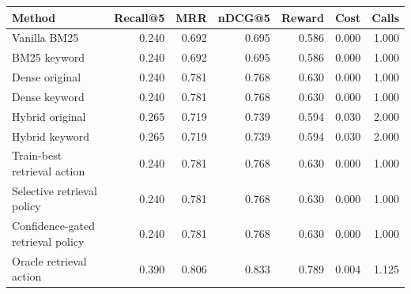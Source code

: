 \begin{tabular}{lrrrrrr}
\toprule
Method & Recall@5 & MRR & nDCG@5 & Reward & Cost & Calls \\
\midrule
Vanilla BM25 & 0.240 & 0.692 & 0.695 & 0.586 & 0.000 & 1.000 \\
BM25 keyword & 0.240 & 0.692 & 0.695 & 0.586 & 0.000 & 1.000 \\
Dense original & 0.240 & 0.781 & 0.768 & 0.630 & 0.000 & 1.000 \\
Dense keyword & 0.240 & 0.781 & 0.768 & 0.630 & 0.000 & 1.000 \\
Hybrid original & 0.265 & 0.719 & 0.739 & 0.594 & 0.030 & 2.000 \\
Hybrid keyword & 0.265 & 0.719 & 0.739 & 0.594 & 0.030 & 2.000 \\
Train-best retrieval action & 0.240 & 0.781 & 0.768 & 0.630 & 0.000 & 1.000 \\
Selective retrieval policy & 0.240 & 0.781 & 0.768 & 0.630 & 0.000 & 1.000 \\
Confidence-gated retrieval policy & 0.240 & 0.781 & 0.768 & 0.630 & 0.000 & 1.000 \\
Oracle retrieval action & 0.390 & 0.806 & 0.833 & 0.789 & 0.004 & 1.125 \\
\bottomrule
\end{tabular}

